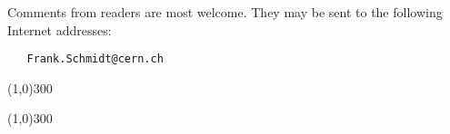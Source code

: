 \begin{itemize}
 Comments from readers are most welcome. They may be sent to the following Internet addresses: 
\begin{verbatim}
   Frank.Schmidt@cern.ch
\end{verbatim}

\line(1,0){300}


\line(1,0){300}

\end{itemize}

